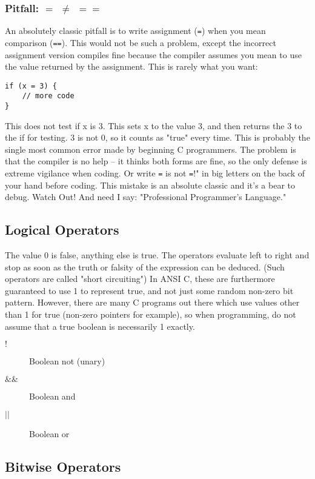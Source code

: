 \subsubsection{Pitfall: $=$ $\ne$ $==$}

An absolutely classic pitfall is to write assignment (\lstinline{=}) when you mean comparison (\lstinline{==}). This would not be such a problem, except the incorrect assignment version compiles fine because the compiler assumes you mean to use the value returned by the assignment. This is rarely what you want:

\begin{lstlisting}
if (x = 3) {
    // more code 
}
\end{lstlisting}

This does not test if x is 3. This sets x to the value 3, and then returns the 3 to the if for testing. 3 is not 0, so it counts as "true" every time. This is probably the single most common error made by beginning C programmers. The problem is that the compiler is no help -- it thinks both forms are fine, so the only defense is extreme vigilance when coding. Or write \lstinline{=} is not \lstinline{=}!" in big letters on the back of your hand before coding. This mistake is an absolute classic and it's a bear to debug. Watch Out! And need I say: "Professional Programmer's Language."

\subsection{Logical Operators}

The value 0 is false, anything else is true. The operators evaluate left to right and stop as soon as the truth or falsity of the expression can be deduced. (Such operators are called "short circuiting") In ANSI C, these are furthermore guaranteed to use 1 to represent true, and not just some random non-zero bit pattern. However, there are many C programs out there which use values other than 1 for true (non-zero pointers for example), so when programming, do not assume that a true boolean is necessarily 1 exactly.

\begin{description}
\item[$!$] Boolean not (unary)
\item[$\&\&$] Boolean and
\item[$||$] Boolean or
\end{description}

\subsection{Bitwise Operators}

